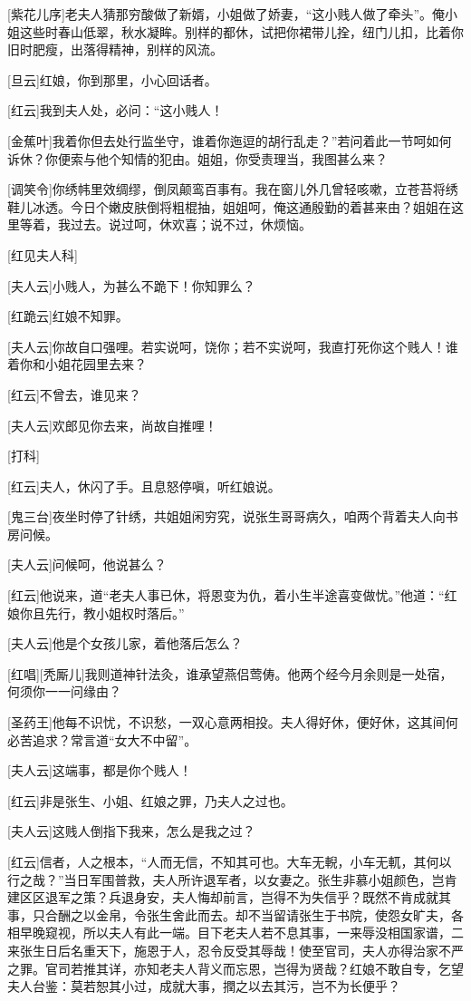 \documentclass{book}
\begin{document}
[紫花儿序]老夫人猜那穷酸做了新婿，小姐做了娇妻，``这小贱人做了牵头''。俺小姐这些时春山低翠，秋水凝眸。别样的都休，试把你裙带儿拴，纽门儿扣，比着你旧时肥瘦，出落得精神，别样的风流。

[旦云]红娘，你到那里，小心回话者。

[红云]我到夫人处，必问：``这小贱人！

[金蕉叶]我着你但去处行监坐守，谁着你迤逗的胡行乱走？''若问着此一节呵如何诉休？你便索与他个知情的犯由。姐姐，你受责理当，我图甚么来？

[调笑令]你绣帏里效绸缪，倒凤颠鸾百事有。我在窗儿外几曾轻咳嗽，立苍苔将绣鞋儿冰透。今日个嫩皮肤倒将粗棍抽，姐姐呵，俺这通殷勤的着甚来由？姐姐在这里等着，我过去。说过呵，休欢喜；说不过，休烦恼。

[红见夫人科]

[夫人云]小贱人，为甚么不跪下！你知罪么？

[红跪云]红娘不知罪。

[夫人云]你故自口强哩。若实说呵，饶你；若不实说呵，我直打死你这个贱人！谁着你和小姐花园里去来？

[红云]不曾去，谁见来？

[夫人云]欢郎见你去来，尚故自推哩！

[打科]

[红云]夫人，休闪了手。且息怒停嗔，听红娘说。

[鬼三台]夜坐时停了针绣，共姐姐闲穷究，说张生哥哥病久，咱两个背着夫人向书房问候。

[夫人云]问候呵，他说甚么？

[红云]他说来，道``老夫人事已休，将恩变为仇，着小生半途喜变做忧。''他道：``红娘你且先行，教小姐权时落后。''

[夫人云]他是个女孩儿家，着他落后怎么？

[红唱][秃厮儿]我则道神针法灸，谁承望燕侣莺俦。他两个经今月余则是一处宿，何须你一一问缘由？

[圣药王]他每不识忧，不识愁，一双心意两相投。夫人得好休，便好休，这其间何必苦追求？常言道``女大不中留''。

[夫人云]这端事，都是你个贱人！

[红云]非是张生、小姐、红娘之罪，乃夫人之过也。

[夫人云]这贱人倒指下我来，怎么是我之过？

[红云]信者，人之根本，``人而无信，不知其可也。大车无輗，小车无軏，其何以行之哉？''当日军围普救，夫人所许退军者，以女妻之。张生非慕小姐颜色，岂肯建区区退军之策？兵退身安，夫人悔却前言，岂得不为失信乎？既然不肯成就其事，只合酬之以金帛，令张生舍此而去。却不当留请张生于书院，使怨女旷夫，各相早晚窥视，所以夫人有此一端。目下老夫人若不息其事，一来辱没相国家谱，二来张生日后名重天下，施恩于人，忍令反受其辱哉！使至官司，夫人亦得治家不严之罪。官司若推其详，亦知老夫人背义而忘恩，岂得为贤哉？红娘不敢自专，乞望夫人台鉴：莫若恕其小过，成就大事，撋之以去其污，岂不为长便乎？
\end{document}
